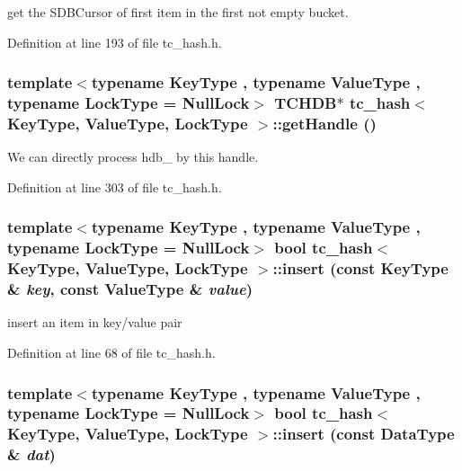 get the SDBCursor of first item in the first not empty bucket. 

Definition at line 193 of file tc\_\-hash.h.\hypertarget{classtc__hash_ab77b561b8897ccdca73515233493f7a}{
\subsubsection[{getHandle}]{\setlength{\rightskip}{0pt plus 5cm}template$<$typename KeyType , typename ValueType , typename LockType  = NullLock$>$ TCHDB$\ast$ {\bf tc\_\-hash}$<$ KeyType, ValueType, LockType $>$::getHandle ()}}
\label{classtc__hash_ab77b561b8897ccdca73515233493f7a}


We can directly process hdb\_\- by this handle. 

Definition at line 303 of file tc\_\-hash.h.\hypertarget{classtc__hash_a0f14b10040effe879ba2deb5c0a961b}{
\subsubsection[{insert}]{\setlength{\rightskip}{0pt plus 5cm}template$<$typename KeyType , typename ValueType , typename LockType  = NullLock$>$ bool {\bf tc\_\-hash}$<$ KeyType, ValueType, LockType $>$::insert (const KeyType \& {\em key}, \/  const ValueType \& {\em value})}}
\label{classtc__hash_a0f14b10040effe879ba2deb5c0a961b}


insert an item in key/value pair 

Definition at line 68 of file tc\_\-hash.h.\hypertarget{classtc__hash_dec46db22458aace6d4c384d0136f73a}{
\subsubsection[{insert}]{\setlength{\rightskip}{0pt plus 5cm}template$<$typename KeyType , typename ValueType , typename LockType  = NullLock$>$ bool {\bf tc\_\-hash}$<$ KeyType, ValueType, LockType $>$::insert (const DataType \& {\em dat})}}
\label{classtc__hash_dec46db22458aace6d4c384d0136f73a}


